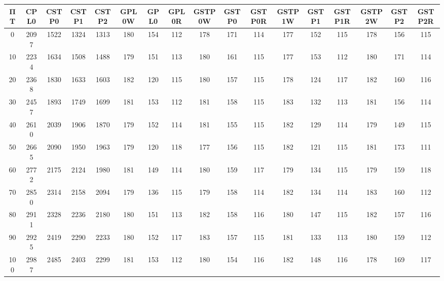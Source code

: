 \begin{tabular}{|c|c|c|c|c|c|c|c|c|c|c|c|c|c|c|c|c|}
\hline
ΠΤ&CPL0&CSTP0&CSTP1&CSTP2&GPL0W&GPL0&GPL0R&GSTP0W&GSTP0&GSTP0R&GSTP1W&GSTP1&GSTP1R&GSTP2W&GSTP2&GSTP2R\\\hline
\hline
0&2097&1522&1324&1313&180&154&112&178&171&114&177&152&115&178&156&115\\
\hline
10&2234&1634&1508&1488&179&151&113&180&161&115&177&153&112&180&171&114\\
\hline
20&2368&1830&1633&1603&182&120&115&180&157&115&178&124&117&182&160&116\\
\hline
30&2457&1893&1749&1699&181&153&112&181&158&115&183&132&113&181&156&114\\
\hline
40&2610&2039&1906&1870&179&152&114&181&155&115&182&129&114&179&149&115\\
\hline
50&2665&2090&1950&1963&179&120&118&177&156&115&182&121&115&181&173&111\\
\hline
60&2772&2175&2124&1980&181&149&114&180&159&117&179&134&115&179&159&118\\
\hline
70&2850&2314&2158&2094&179&136&115&179&158&114&182&134&114&183&160&112\\
\hline
80&2911&2328&2236&2180&180&151&113&182&158&116&180&147&115&182&157&116\\
\hline
90&2925&2419&2290&2233&180&152&117&183&157&115&181&133&113&180&159&112\\
\hline
100&2987&2485&2403&2299&181&153&112&180&154&116&182&148&116&178&169&117\\
\hline
\end{tabular}
